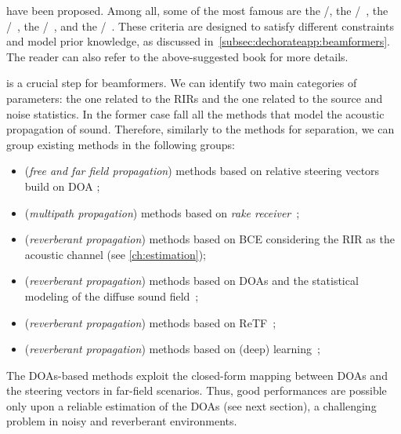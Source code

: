  have been proposed.
Among all, some of the most famous are the \DStxt/, the \MVDRtxt/~, the \MaxSNRtxt/~, the \MaxSINRtxt/~, and the \LCMVtxt/~.
These criteria are designed to satisfy different constraints and model prior knowledge, as discussed in~\cref{subsec:dechorateapp:beamformers}.
The reader can also refer to the above-suggested book for more details.

 is a crucial step for beamformers.
We can identify two main categories of parameters: the one related to the \acp{RIR} and the one related to the source and noise statistics.
In the former case fall all the methods that model the acoustic propagation of sound.
Therefore, similarly to the methods for separation, we can group existing methods in the following groups:
\begin{itemize}
    \item (\textit{free and far field propagation}) methods based on relative steering vectors build on \ac{DOA} ;
    \item (\textit{multipath propagation}) methods based on \textit{rake receiver}~;
    \item (\textit{reverberant propagation}) methods based on \ac{BCE} considering the \ac{RIR} as the acoustic channel (see \cref{ch:estimation});
    \item (\textit{reverberant propagation}) methods based on \acp{DOA} and the statistical modeling of the diffuse sound field~;
    \item (\textit{reverberant propagation}) methods based on \ac{ReTF}~;
    \item (\textit{reverberant propagation}) methods based on (deep) learning~;
\end{itemize}
The \acp{DOA}-based methods exploit the closed-form mapping between \acp{DOA} and the steering vectors in far-field scenarios.
Thus, good performances are possible only upon a reliable estimation of the \acp{DOA} (see next section), a challenging problem in noisy and reverberant environments.
